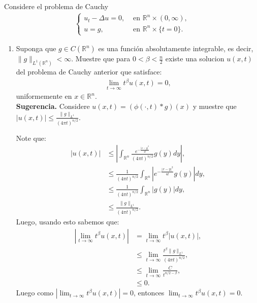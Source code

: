 \begin{homeworkProblem}
  Considere el problema de Cauchy
  \begin{align*}
    \begin{cases}
      u_t-\Delta u=0, &\text{ en } \mathbb{R}^{n}\times (0,\infty) \text{,} \\
      u=g, &\text{ en } \mathbb{R}^{n}\times\{t=0\} .
    \end{cases}
  \end{align*}
  \begin{enumerate}
    \item Suponga que $g\in C(\mathbb{R}^{n})$ es una función absolutamente integrable, es decir,$\|g\|_{L^1(\mathbb{R}^{n})}< \infty$. Muestre que para $0< \beta < \frac{n}{2}$ existe una solucion $u(x,t)$ del problema de Cauchy anterior que satisface:
    \begin{align*}
      \lim_{t\rightarrow\infty}t^{\beta}u(x,t)=0,
    \end{align*}
    uniformemente en $x\in\mathbb{R}^{n}$.\\
    \textbf{Sugerencia.} Considere $u(x,t)=(\phi(\cdot,t)*g)(x)$ y muestre que $|u(x,t)|\leq \frac{\|g\|_{L^1}}{(4\pi t)^{n/2}}$.
    \begin{solucion}
      Note que:
      \begin{align*}
        |u(x,t)|&\leq \left| \int_{\mathbb{R}^{n}}\frac{e^{-\frac{|x-y|^2}{4t}}}{(4\pi t)^{n/2}}g(y)dy \right|,\\
        &\leq \frac{1}{(4\pi t)^{n/2}}\int_{\mathbb{R}^{n}}\left| e^{-\frac{|x-y|^2}{4t}}g(y) \right|dy,\\
        &\leq \frac{1}{(4\pi t)^{n/2}}\int_{\mathbb{R}^{n}}\left| g(y) \right|dy,\\
        &\leq \frac{\|g\|_{L^1}}{(4\pi t)^{n/2}}.
      \end{align*}
      Luego, usando esto sabemos que:
      \begin{align*}
        |\lim_{t \rightarrow \infty}t^{\beta}u(x,t)|&=\lim_{t\rightarrow\infty}t^{\beta}|u(x,t)|,\\
        &\leq\lim_{t \rightarrow \infty}\frac{t^{\beta}\|g\|_{L^1}}{(4\pi t)^{n/2}},\\
        &\leq \lim_{t\rightarrow\infty} \frac{C}{t^{n/2-\beta}},\\
        &\leq 0.
      \end{align*}
      Luego como $|\lim_{t\rightarrow\infty}t^{\beta}u(x,t)|=0$, entonces $\lim_{t\rightarrow\infty}t^{\beta}u(x,t)=0$.\\

\end{solucion}
\end{enumerate}
\end{homeworkProblem}
